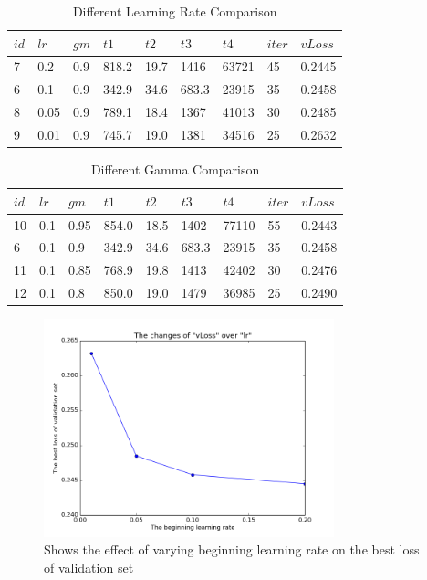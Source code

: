 \begin{table}[tb]

\caption{Different Learning Rate Comparison} \label{tab:group41} 
\begin{center}
\begin{tabular}{|l|l|l|l|l|l|l|l|l|}
\hline
$id$& $lr$ & $gm$ & $t1$ & $t2$  & $t3$ & $t4$ & $iter$ &    $vLoss$  	  \\ 
\hline
7   & 0.2 & 0.9 & 818.2  & 19.7  & 1416 &    63721  & 45 & 0.2445 \\ \hline
6 	& 0.1 & 0.9 & 342.9	& 34.6	& 683.3 &	23915  & 35 & 0.2458  \\ \hline 
8   & 0.05 & 0.9 & 789.1  & 18.4  & 1367 &   41013  & 30 & 0.2485 \\ \hline
9   & 0.01 & 0.9 & 745.7  & 19.0  & 1381 &   34516  & 25 & 0.2632  \\ \hline
\end{tabular}
\end{center}
\end{table}

\begin{table}[tb]
\caption{Different Gamma Comparison} \label{tab:group42} 
\begin{center}
\begin{tabular}{|l|l|l|l|l|l|l|l|l|}
\hline
$id$& $lr$ & $gm$ & $t1$ & $t2$  & $t3$ & $t4$ & $iter$ &    $vLoss$  	  \\ 
\hline
10   & 0.1 & 0.95 & 854.0  & 18.5  & 1402 &   77110  & 55 & 0.2443 \\ \hline
6 	& 0.1 & 0.9 & 342.9	& 34.6	& 683.3 &	23915  & 35 & 0.2458   \\ \hline
11   & 0.1 & 0.85 & 768.9  & 19.8  & 1413 &   42402  & 30 & 0.2476 \\ \hline
12   & 0.1 & 0.8 & 850.0  & 19.0  & 1479 &   36985  & 25 & 0.2490 \\ \hline
\end{tabular}
\end{center}
\end{table}

\begin{figure}[H]
\centering
        \includegraphics[width=0.75\textwidth]{lrloss} 
        \caption{Shows the effect of varying beginning learning rate on the best loss of validation set}	
        \label{fig:lrloss}
\end{figure}        

